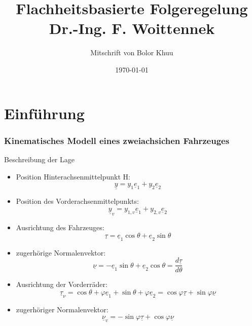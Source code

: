 \documentclass[ngerman]{tudscrreprt}
\begin{document}
 \department{}  \chair{} \title{Flachheitsbasierte Folgeregelung\\Dr.-Ing. F. Woittennek
}
\author{Mitschrift von Bolor Khuu}
\date{\today}
\maketitle
\tableofcontents
\newpage
\chapter{Einführung}
\subsection*{Kinematisches Modell eines zweiachsichen Fahrzeuges}
Beschreibung der Lage
\begin{itemize}
\item Position Hinterachsenmittelpunkt H:
\begin{equation*}
\underline{y} = y_1 \underline e_1 + y_2 \underline e_2
\end{equation*}
\item Position des Vorderachsenmittelpunkts:
\begin{equation*}
\underline{y}_v = y_{1,v} \underline e_1 + y_{2,v} \underline e_2
\end{equation*}
\item Ausrichtung des Fahrzeuges:
\begin{equation*}
\underline{\tau} = \underline e_1 \cos{\theta} + \underline e_2 \sin{\theta}
\end{equation*}
\item zugerhörige Normalenvektor: 
\begin{equation*}
\underline{\nu} = -\underline e_1\sin{\theta} + \underline e_2 \cos{\theta} = \frac{d\underline{\tau}}{d\theta}
\end{equation*}
\item Ausrichtung der Vorderräder:
\begin{equation*}
\underline{\tau}_\nu = \cos{\theta + \varphi}\underline e_1 + \sin{\theta + \varphi} \underline e_2 = \cos{\varphi} \underline{\tau} + \sin{\varphi}\underline{\nu}
\tag{1}
\end{equation*}
\item zugerhöriger Normalenvektor:
\begin{equation*}
\underline{\nu}_v = -\sin{\varphi}\underline{\tau} + \cos{\varphi} \underline \nu
\label{Eq:norma2}
\tag{2}
\end{equation*}
\end{itemize}
\end{document}
